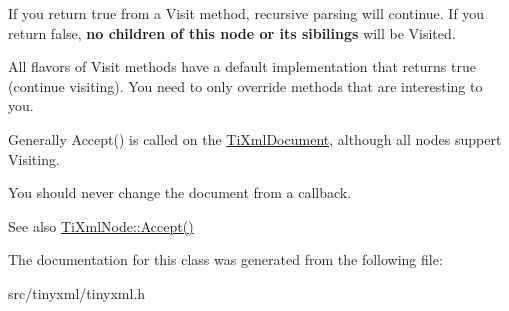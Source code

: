 If you return \textquotesingle{}true\textquotesingle{} from a Visit method, recursive parsing will continue. If you return false, {\bfseries no children of this node or its sibilings} will be Visited.

All flavors of Visit methods have a default implementation that returns \textquotesingle{}true\textquotesingle{} (continue visiting). You need to only override methods that are interesting to you.

Generally Accept() is called on the \hyperlink{classTiXmlDocument}{Ti\+Xml\+Document}, although all nodes suppert Visiting.

You should never change the document from a callback.

\begin{DoxySeeAlso}{See also}
\hyperlink{classTiXmlNode_acc0f88b7462c6cb73809d410a4f5bb86}{Ti\+Xml\+Node\+::\+Accept()} 
\end{DoxySeeAlso}


The documentation for this class was generated from the following file\+:\begin{DoxyCompactItemize}
\item 
src/tinyxml/tinyxml.\+h\end{DoxyCompactItemize}
